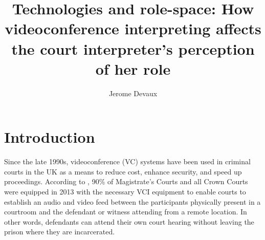 \documentclass[output=paper]{langsci/langscibook}
\author{Jerome Devaux\affiliation{affiliation}}
\title{Technologies and role-space: How videoconference interpreting affects the court interpreter’s perception of her role}
\begin{document}

 

 

 

 

 

 

 

 

 

 

 

\section{Introduction}
\label{sec:devaux:1}
Since the late 1990s, videoconference (\textsc{VC}) systems have been used in criminal courts in the UK \citep{Plotnikoff1999, Plotnikoff2000} as a means to reduce cost, enhance security, and speed up proceedings. According to \citep{Braun2016b}, 90\% of Magistrate’s Courts and all Crown Courts were equipped in 2013 with the necessary \textsc{VCI} equipment to enable courts to establish an audio and video feed between the participants physically present in a courtroom and the defendant or witness attending from a remote location. In other words, defendants can attend their own court hearing without leaving the prison where they are incarcerated. 
\end{document}
